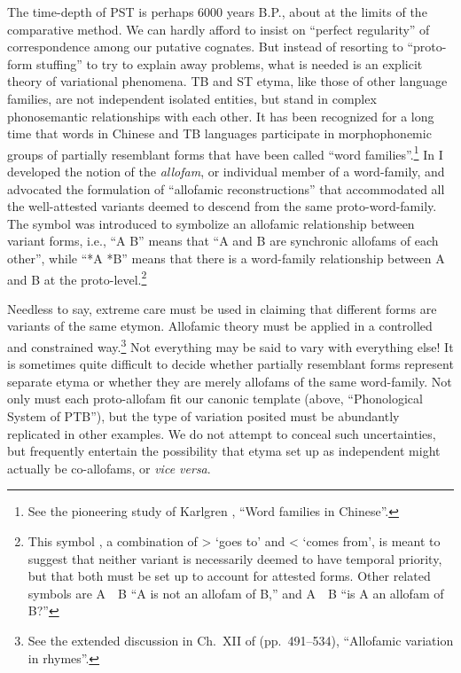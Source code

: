 The time-depth of PST is perhaps 6000 years B.P., about at the limits of the
comparative method. We can hardly afford to insist on “perfect regularity” of
correspondence among our putative cognates. But instead of resorting to
“proto-form stuffing” to try to explain away problems, what is needed is an
explicit theory of variational phenomena. TB and ST etyma, like those of other
language families, are not independent isolated entities, but stand in complex
phonosemantic relationships with each other. It has been recognized for a long
time that words in Chinese and TB languages participate in morphophonemic groups
of partially resemblant forms that have been called “word families”.\footnote{See
the pioneering study of Karlgren \citeyearpar{BK-WFC}, “Word families in Chinese”.}  In
\textit{} I developed the notion of the \textit{allofam},
or individual member of a word-family, and advocated the formulation of “allofamic reconstructions”
that accommodated all the well-attested variants deemed to descend from the same
proto-word-family. The symbol  was introduced to symbolize an allofamic
relationship between variant forms, i.e., “A  B” means that “A and B are
synchronic allofams of each other”, while “*A  *B” means that there is a
word-family relationship between A and B at the proto-level.\footnote{This
symbol , a combination of  >  ‘goes to’ and < ‘comes from’, is meant to suggest
that neither variant is necessarily deemed to have temporal priority, but that
both must be set up to account for attested forms. Other related symbols are A~~B 
“A is not an allofam of B,” and A~~B “is A an allofam of B?”}


Needless to say, extreme care must be used in claiming that different forms
are variants of the same etymon. Allofamic theory must be applied in a
controlled and constrained way.\footnote{See the extended discussion in Ch.~XII
of \textit{} (pp.~491–534), “Allofamic variation in  rhymes”.} Not everything may be
said to vary with everything else! It is sometimes quite difficult to decide
whether partially resemblant forms represent separate etyma or whether they are
merely allofams of the same word-family. Not only must each proto-allofam fit
our canonic template (above, “Phonological System of PTB”), but the type of variation posited must be
abundantly replicated in other examples. We do not attempt to
conceal such uncertainties, but frequently entertain the possibility that etyma
set up as independent might actually be co-allofams, or \textit{vice versa}.

